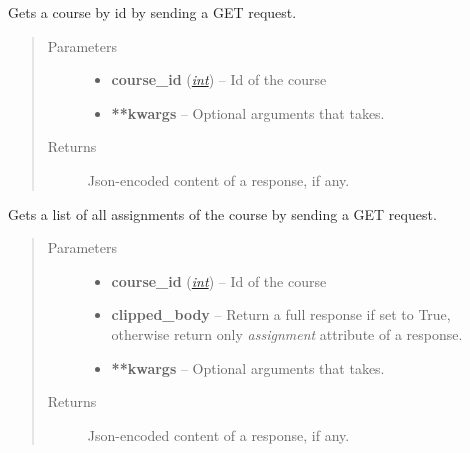 \documentclass[letterpaper,10pt,english]{sphinxmanual}
\begin{document}

\begin{fulllineitems}
\label{web_portal:core.courses.api.get_course}
Gets a course by id by sending a GET request.
\begin{quote}\begin{description}
\item[{Parameters}] \leavevmode\begin{itemize}
\item {} 
\textbf{course\_id} (\href{http://docs.python.org/library/functions.html\#int}{\emph{int}}) -- Id of the course

\item {} 
\textbf{**kwargs} -- Optional arguments that  takes.

\end{itemize}

\item[{Returns}] \leavevmode
Json-encoded content of a response, if any.

\end{description}\end{quote}

\end{fulllineitems}


\begin{fulllineitems}
\label{web_portal:core.courses.api.get_assignments}
Gets a list of all assignments of the course by sending a GET request.
\begin{quote}\begin{description}
\item[{Parameters}] \leavevmode\begin{itemize}
\item {} 
\textbf{course\_id} (\href{http://docs.python.org/library/functions.html\#int}{\emph{int}}) -- Id of the course

\item {} 
\textbf{clipped\_body} -- Return a full response if set to True, otherwise     return only \emph{assignment} attribute of a response.

\item {} 
\textbf{**kwargs} -- Optional arguments that  takes.

\end{itemize}

\item[{Returns}] \leavevmode
Json-encoded content of a response, if any.

\end{description}\end{quote}

\end{fulllineitems}
\end{document}
